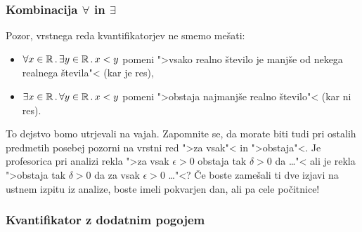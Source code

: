 \begin{center}
\end{center}


\subsubsection{Kombinacija $\forall$ in $\exists$}

Pozor, vrstnega reda kvantifikatorjev ne smemo mešati:
%
\begin{itemize}
\item $\forall x \in \mathbb{R} \,.\, \exists y \in \mathbb{R} \,.\, x < y$ pomeni ">vsako realno število je manjše od nekega realnega števila"< (kar je res),
\item $\exists x \in \mathbb{R} \,.\, \forall y \in \mathbb{R} \,.\, x < y$ pomeni ">obstaja najmanjše realno število"< (kar ni res).
\end{itemize}
%
To dejstvo bomo utrjevali na vajah. Zapomnite se, da morate biti tudi pri ostalih predmetih posebej pozorni na vrstni red
">za vsak"< in ">obstaja"<. Je profesorica pri analizi rekla ">za vsak $\epsilon > 0$ obstaja tak $\delta > 0$ da \dots"< ali je rekla ">obstaja tak $\delta > 0$ da za vsak $\epsilon > 0$ \dots"<? Če boste zamešali ti dve izjavi na ustnem izpitu iz analize, boste imeli pokvarjen dan, ali pa cele počitnice!


\subsubsection{Kvantifikator z dodatnim pogojem}

